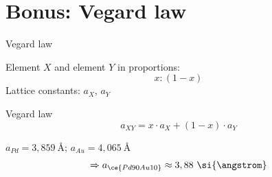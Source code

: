 \documentclass{beamer}
\begin{document}
\section{Bonus: Vegard law}

\begin{frame}{Vegard law}
    \begin{block}{}
        Element $X$ and element $Y$ in proportions:
        \begin{equation*}
            x:(1-x)
        \end{equation*}
        Lattice constants: $a_X$, $a_Y$
    \end{block}
    \begin{alertblock}{Vegard law}
        \begin{equation*}
            a_{XY} = x \cdot a_X + (1-x) \cdot a_Y  
        \end{equation*}
    \end{alertblock}
    \begin{exampleblock}{}
        $a_{Pd} = 3,859 \ \si{\angstrom} $; $a_{Au} = 4,065 \ \si{\angstrom}$
        \begin{equation*}
            \Rightarrow a_{\ce{Pd90Au10}} \approx 3,88 \ \si{\angstrom}
        \end{equation*}
    \end{exampleblock}
\end{frame}
\end{document}
